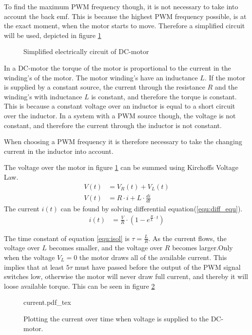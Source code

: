 \documentclass[../../../Main]{subfiles}
\begin{document}
To find the maximum PWM frequency though, it is not necessary to take into account the back emf. This is because the highest PWM frequency possible, is at the exact moment, when the motor starts to move. Therefore a simplified circuit will be used, depicted in figure \ref{fig:electrical} 

\begin{figure}[H]
	\center
	
	\caption{Simplified electrically circuit of DC-motor}
  \label{fig:electrical}
\end{figure}


In a DC-motor the torque of the motor is proportional to the current in the winding's of the motor. The motor winding's have an inductance $L$.
If the motor is supplied by a constant source, the current through the resistance $R$ and the winding's with inductance $L$ is constant, and therefore the torque is constant. This is because a constant voltage over an inductor is equal to a short circuit over the inductor. 
In a system with a PWM source though, the voltage is not constant, and therefore the current through the inductor is not constant.

When choosing a PWM frequency it is therefore necessary to take the changing current in the inductor into account. 

The voltage over the motor in figure \ref{fig:electrical} can be summed using Kirchoffs Voltage Law. 
\begin{align}
	V(t) &= V_R(t) + V_L(t)\\
	V(t) &= R \cdot i + L \cdot \frac{di}{dt}
	\label{equ:diff_equ}
\end{align}
The current $i(t)$ can be found by solving differential equation(\ref{equ:diff_equ}).   
\begin{align}
	i(t) &=\frac{V}{R} \cdot (1-e^{\frac{R}{L} \cdot t})
	\label{equ:isol}
\end{align}

The time constant of equation \ref{equ:isol} is $\tau = \frac{L}{R}$.
As the current flows, the voltage over $L$ becomes smaller, and the voltage over $R$ becomes larger.Only when the voltage $V_L = 0$ the motor draws all of the available current. This implies that at least $5\tau$ must have passed before the output of the PWM signal switches low, otherwise the motor will never draw full current, and thereby it will loose available  torque. This can be seen in figure \ref{fig:currentplot}

\begin{figure}[H]
\centering
\def\svgwidth{\textwidth}
{current.pdf_tex}
\caption{Plotting the current over time when voltage is supplied to the DC-motor.}
\label{fig:currentplot}
\end{figure}
\end{document}
